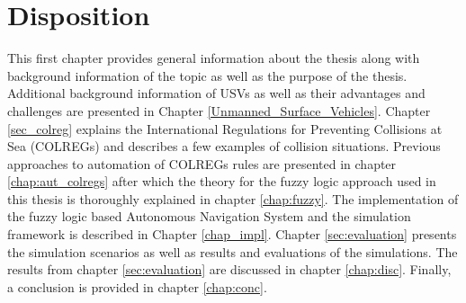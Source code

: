 \section{Disposition}
This first chapter  provides  general information about the thesis along with background information of the topic as well as
the purpose of the thesis. Additional background information of USVs as well as their advantages and challenges are presented in Chapter \ref{Unmanned_Surface_Vehicles}. Chapter \ref{sec_colreg} explains the International Regulations for Preventing Collisions
at Sea (COLREGs) and describes a few examples of collision situations.  Previous approaches to automation of COLREGs rules are presented in chapter \ref{chap:aut_colregs} after which the theory for the fuzzy logic approach used in this thesis is thoroughly explained in chapter \ref{chap:fuzzy}. The implementation of the fuzzy logic based Autonomous Navigation System and the simulation framework is described in Chapter \ref{chap_impl}. Chapter \ref{sec:evaluation} presents the simulation scenarios as well as results and evaluations of the simulations. The results from chapter \ref{sec:evaluation} are discussed in chapter \ref{chap:disc}. Finally, a conclusion is provided in chapter \ref{chap:conc}.